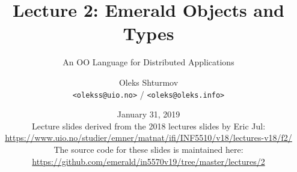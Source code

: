 \documentclass[xcolor=table]{beamer}
\title{{\Large Lecture 2: Emerald Objects and Types}}
\subtitle{An OO Language for Distributed Applications}
\institute{University of Oslo}
\author{Oleks Shturmov\\[-0.2em]%
  {\tiny \texttt{<olekss@uio.no>} / \texttt{<oleks@oleks.info>}}
}
\date{January 31, 2019\\[2em]
{\scriptsize Lecture slides derived from the 2018 lectures slides by%
Eric Jul: \\ {\tiny%
\url{https://www.uio.no/studier/emner/matnat/ifi/INF5510/v18/lectures-v18/f2/}}%
\\[1em] The source code for these slides is maintained here: \\[-0.5em] {\tiny%
\url{https://github.com/emerald/in5570v19/tree/master/lectures/2}}%
}}
\begin{document}
\begin{frame} \titlepage \end{frame}


















\end{document}
